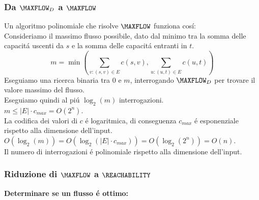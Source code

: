 \subsubsection{Da $\MAXFLOW_D$ a $\MAXFLOW$}
Un algoritmo polinomiale che risolve $\MAXFLOW$ funziona cosí: \\
Consideriamo il massimo flusso possibile, dato dal minimo tra la somma delle capacitá uscenti da $s$ e la somma delle capacitá entranti in $t$. \\
\[
m = \min\left(\sum_{v : (s,v) \in E} c(s, v), \sum_{u : (u, t) \in E} c(u, t)\right)
\]
Eseguiamo una ricerca binaria tra $0$ e $m$, interrogando $\MAXFLOW_D$ per trovare il valore massimo del flusso. \\
Eseguiamo quindi al piú $\log_2(m)$ interrogazioni. \\
$m \leq |E| \cdot c_{max} = O(2^n)$. \\
La codifica dei valori di $c$ é logaritmica, di conseguenza $c_{max}$ é esponenziale rispetto alla dimensione dell'input. \\
$O(\log_2(m)) = O(\log_2(|E| \cdot c_{max})) = O(\log_2(2^n)) = O(n)$. \\
Il numero di interrogazioni é polinomiale rispetto alla dimensione dell'input.

\subsubsection{Riduzione di $\MAXFLOW$ a $\REACHABILITY$}
\label{riduzione:maxflow_reachability}

\textbf{Determinare se un flusso é ottimo:}

